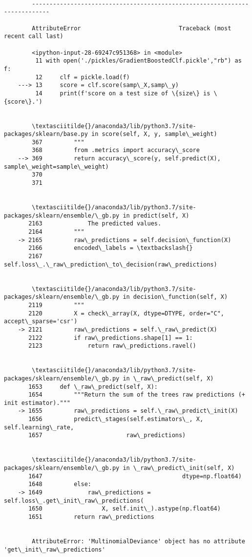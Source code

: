 \documentclass[11pt]{article}
\begin{document}
    \begin{Verbatim}[commandchars=\\\{\}]

        ---------------------------------------------------------------------------

        AttributeError                            Traceback (most recent call last)

        <ipython-input-28-69247c951368> in <module>
         11 with open('./pickles/GradientBoostedClf.pickle',"rb") as f:
         12     clf = pickle.load(f)
    ---> 13     score = clf.score(samp\_X,samp\_y)
         14     print(f'score on a test size of \{size\} is \{score\}.')


        \textasciitilde{}/anaconda3/lib/python3.7/site-packages/sklearn/base.py in score(self, X, y, sample\_weight)
        367         """
        368         from .metrics import accuracy\_score
    --> 369         return accuracy\_score(y, self.predict(X), sample\_weight=sample\_weight)
        370 
        371 


        \textasciitilde{}/anaconda3/lib/python3.7/site-packages/sklearn/ensemble/\_gb.py in predict(self, X)
       2163             The predicted values.
       2164         """
    -> 2165         raw\_predictions = self.decision\_function(X)
       2166         encoded\_labels = \textbackslash{}
       2167             self.loss\_.\_raw\_prediction\_to\_decision(raw\_predictions)


        \textasciitilde{}/anaconda3/lib/python3.7/site-packages/sklearn/ensemble/\_gb.py in decision\_function(self, X)
       2119         """
       2120         X = check\_array(X, dtype=DTYPE, order="C", accept\_sparse='csr')
    -> 2121         raw\_predictions = self.\_raw\_predict(X)
       2122         if raw\_predictions.shape[1] == 1:
       2123             return raw\_predictions.ravel()


        \textasciitilde{}/anaconda3/lib/python3.7/site-packages/sklearn/ensemble/\_gb.py in \_raw\_predict(self, X)
       1653     def \_raw\_predict(self, X):
       1654         """Return the sum of the trees raw predictions (+ init estimator)."""
    -> 1655         raw\_predictions = self.\_raw\_predict\_init(X)
       1656         predict\_stages(self.estimators\_, X, self.learning\_rate,
       1657                        raw\_predictions)


        \textasciitilde{}/anaconda3/lib/python3.7/site-packages/sklearn/ensemble/\_gb.py in \_raw\_predict\_init(self, X)
       1647                                        dtype=np.float64)
       1648         else:
    -> 1649             raw\_predictions = self.loss\_.get\_init\_raw\_predictions(
       1650                 X, self.init\_).astype(np.float64)
       1651         return raw\_predictions


        AttributeError: 'MultinomialDeviance' object has no attribute 'get\_init\_raw\_predictions'

    \end{Verbatim}
\end{document}
